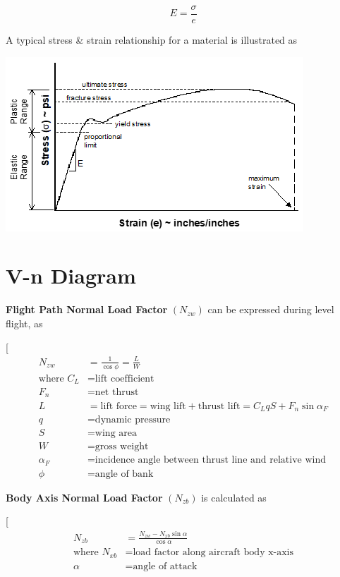 \documentclass[
]{book}
\begin{document}
\[
  E = \frac{\sigma}{e}
\]

A typical stress \& strain relationship for a material is illustrated as

\includegraphics[width=4.39514in,height=2.57292in]{media/09/image2.png}

\hypertarget{v-n-diagram}{%
\section{V-n Diagram}\label{v-n-diagram}}

\textbf{Flight Path Normal Load Factor} \(\left(N_{zw} \right)\) can be expressed during level flight, as

{[}
\begin{align}
  N_{zw} &= \frac{1}{\cos \phi} = \frac{L}{W} \\
  \text{where } C_L &= \text{lift coefficient} \\
  F_n &= \text{net thrust} \\
  L &= \text{lift force} = \text{wing lift} + \text{thrust lift} = C_L qS + F_n \sin \alpha_F \\
  q &= \text{dynamic pressure} \\
  S &= \text{wing area} \\
  W &= \text{gross weight} \\
  \alpha_F &= \text{incidence angle between thrust line and relative wind} \\
  \phi &= \text{angle of bank}
  \end{align}

\textbf{Body Axis Normal Load Factor} \(\left(N_{zb} \right)\) is calculated as

{[}
\begin{align}
  N_{zb} &= \frac{N_{zw} - N_{xb} \sin \alpha}{\cos \alpha} \\
  \text{where } N_{xb} &= \text{load factor along aircraft body x-axis} \\
  \alpha &= \text{angle of attack} \\
  \end{align}
\end{document}
